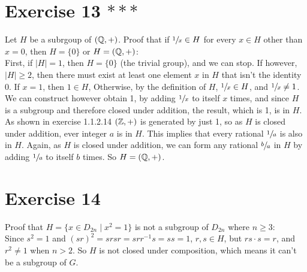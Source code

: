 \documentclass[12pt]{article}
\begin{document}
    \section*{Exercise 13 $***$}
    Let $H$ be a subrgoup of $(\mathbb{Q}, +)$.
    Proof that if $\sfrac{1}{x} \in H$ for every $x \in H$ other than $x = 0$,
    then $H = \{0\}$ or $H = (\mathbb{Q}, +)$: \\
    First, if $|H| = 1$, then $H = \{0\}$ (the trivial group),
    and we can stop.
    If however, $|H| \geqslant 2$,
    then there must exist at least one element $x$ in $H$ that isn't the
    identity 0.
    If $x = 1$, then $1 \in H$,
    Otherwise, by the definition of $H$, $\sfrac{1}{x} \in H$,
    and $\sfrac{1}{x} \neq 1$.
    We can construct however obtain 1,
    by adding $\sfrac{1}{x}$ to itself $x$ times,
    and since $H$ is a subgroup and therefore closed under addition,
    the result, which is 1, is in $H$.
    As shown in exercise 1.1.2.14 $(\mathbb{Z}, +)$ is generated by just 1,
    so as $H$ is closed under addition,
    ever integer $a$ is in $H$.
    This implies that every rational $\sfrac{1}{a}$ is also in $H$.
    Again, as $H$ is closed under addition,
    we can form any rational $\sfrac{b}{a}$ in $H$
    by adding $\sfrac{1}{a}$ to itself $b$ times.
    So $H = (\mathbb{Q}, +)$.


    \section*{Exercise 14}
    Proof that $H = \{x \in D_{2n} \mid x^2 = 1\}$
    is not a subgroup of $D_{2n}$ where $n \geqslant 3$: \\
    Since $s^2 = 1$ and $(sr)^2 = srsr = srr^{-1}s = ss = 1$,
    $r, s \in H$,
    but $rs \cdot s = r$, and $r^2 \neq 1$ when $n > 2$.
    So $H$ is not closed under composition,
    which means it can't be a subgroup of $G$.
\end{document}
